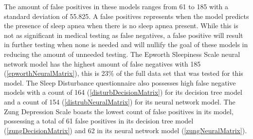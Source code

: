 \documentclass[10pt,conference,a4paper]{IEEEtran}
\begin{document}
The amount of false positives in these models ranges from 61 to 185 with a standard deviation of 55.825. A false positives represents when the model predicts the presence of sleep apnea when there is no sleep apnea present. While this is not as significant in medical testing as false negatives, a false positive will result in further testing when none is needed and will nullify the goal of these models in reducing the amount of unneeded testing. The Epworth Sleepiness Scale neural network model has the highest amount of false negatives with 185 (\autoref{epworthNeuralMatrix}), this is 23\% of the full data set that was tested for this model. The Sleep Disturbance questionnaire also possesses high false negative models with a count of 164 (\autoref{disturbDecisionMatrix}) for its decision tree model and a count of 154 (\autoref{distrubNeuralMatrix}) for its neural network model. The Zung Depression Scale boasts the lowest count of false positives in its model, possessing a total of 61 false positives in its decision tree model (\autoref{zungDecisionMatrix}) and 62 in its neural network model (\autoref{zungNeuralMatrix}).\par
\end{document}
